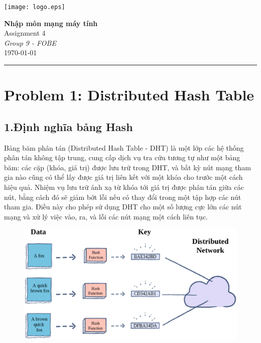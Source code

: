 \documentclass[12pt,a4paper]{article}
\begin{document}
\textcolor{UM_Brown}{
\begin{minipage}{0.1\textwidth}
    \begin{flushleft}
        \texttt{[image: logo.eps]}
    \end{flushleft}
\end{minipage}
\begin{minipage}{0.8\textwidth}
    \begin{center}
        \textbf{\Large Nhập môn mạng máy tính}\\
        \vspace{5pt}
        Assignment 4 \\
        \vspace{20pt}
        \textit{Group 9 - FOBE} \\
        \vspace{5pt}
        \longdate\today
    \end{center}
\end{minipage}
\vspace{10pt}
\hrule
}

\section*{Problem 1: Distributed Hash Table}
\subsection*{1.\;Định nghĩa bảng Hash}
Bảng băm phân tán (Distributed Hash Table - DHT) là một lớp các hệ thống phân tán không tập trung, cung cấp dịch vụ tra cứu tương tự như một bảng băm: các cặp (khóa, giá trị) được lưu trữ trong DHT, và bất kỳ nút mạng tham gia nào cũng có thể lấy được giá trị liên kết với một khóa cho trước một cách hiệu quả. Nhiệm vụ lưu trữ ánh xạ từ khóa tới giá trị được phân tán giữa các nút, bằng cách đó sẽ giảm bớt lỗi nếu có thay đổi trong một tập hợp các nút tham gia. Điều này cho phép sử dụng DHT cho một số lượng cực lớn các nút mạng và xử lý việc vào, ra, và lỗi các nút mạng một cách liên tục.

\begin{figure}[h]
    \centering
    \includegraphics[scale=0.5]{dht.eps}
\end{figure}
\end{document}
